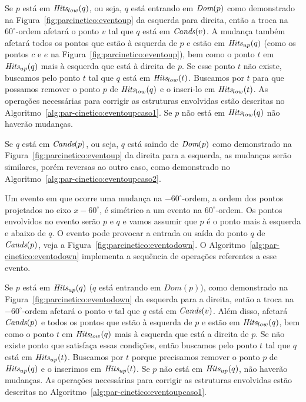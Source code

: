 Se $p$ está em $\textit{Hits}_{low}(q)$, ou seja, $q$ está entrando em $\textit{Dom}(p)$ como demonstrado na
Figura~\ref{fig:parcinetico:eventoup} da esquerda para direita, então a troca na $60^\circ$-ordem
afetará o ponto $v$ tal que $q$ está em $\textit{Cands}(v)$.
A mudança também afetará todos os pontos que estão à esquerda de $p$ e estão em $\textit{Hits}_{up}(q)$
(como os pontos $c$ e $e$ na Figura~\ref{fig:parcinetico:eventoup}),
bem como o ponto $t$ em $\textit{Hits}_{up}(q)$ mais à esquerda que está à direita de $p$.
Se esse ponto $t$ não existe, buscamos pelo ponto $t$ tal que $q$ está em $\textit{Hits}_{low}(t)$.
Buscamos por $t$ para que possamos remover o ponto $p$ de $\textit{Hits}_{low}(q)$ e o inseri-lo em
$\textit{Hits}_{low}(t)$.
As operações necessárias para corrigir as estruturas envolvidas estão descritas no
Algoritmo~\ref{alg:par-cinetico:eventoupcaso1}.
Se $p$ não está em $\textit{Hits}_{low}(q)$ não haverão mudanças.





Se $q$ está em $\textit{Cands}(p)$, ou seja, $q$ está saindo de $\textit{Dom}(p)$ como demonstrado na
Figura~\ref{fig:parcinetico:eventoup} da direita para a esquerda, as mudanças serão similares,
porém reversas ao outro caso, como demonstrado no Algoritmo~\ref{alg:par-cinetico:eventoupcaso2}.



Um evento em que ocorre uma mudança na $-60^\circ$-ordem, a ordem dos pontos projetados no eixo $x
- 60^\circ$, é simétrico a um evento na $60^\circ$-ordem.
Os pontos envolvidos no evento serão $p$ e $q$ e vamos assumir que $p$ é o ponto mais à esquerda e
abaixo de $q$.
O evento pode provocar a entrada ou saída do ponto $q$ de $\textit{Cands}(p)$, veja a
Figura~\ref{fig:parcinetico:eventodown}.
O Algoritmo~\ref{alg:par-cinetico:eventodown} implementa a sequência de operações referentes a esse
evento.



Se $p$ está em $\textit{Hits}_{up}(q)$ ($q$ está entrando em $Dom(p)$), como demonstrado na
Figura~\ref{fig:parcinetico:eventodown} da esquerda para a direita, então a troca na $-60^\circ$-ordem
afetará o ponto $v$ tal que $q$ está em $\textit{Cands}(v)$.
Além disso, afetará $\textit{Cands}(p)$ e todos os pontos que estão à esquerda de $p$ e estão em
$\textit{Hits}_{low}(q)$, bem como o ponto $t$ em $\textit{Hits}_{low}(q)$ mais à esquerda que está a
direita de $p$.
Se não existe ponto que satisfaça essas condições, então buscamos pelo ponto $t$ tal que $q$ está
em $\textit{Hits}_{up}(t)$.
Buscamos por $t$ porque precisamos remover o ponto $p$ de $\textit{Hits}_{up}(q)$ e o inserimos em
$\textit{Hits}_{up}(t)$.
Se $p$ não está em $\textit{Hits}_{up}(q)$, não haverão mudanças.
As operações necessárias para corrigir as estruturas envolvidas estão descritas no
Algoritmo~\ref{alg:par-cinetico:eventoupcaso1}.

